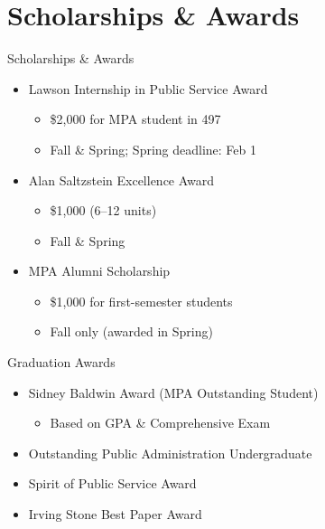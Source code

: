 \documentclass[10pt]{beamer}
\begin{document}
\section{\textcolor{titanorange}{Scholarships \& Awards}}
\begin{frame}{Scholarships \& Awards}
\begin{Large}
\begin{itemize}
  \item Lawson Internship in Public Service Award
    \begin{itemize}
      \item \$2{,}000 for MPA student in 497
      \item Fall \& Spring; Spring deadline: Feb 1
    \end{itemize}
  \item Alan Saltzstein Excellence Award
    \begin{itemize}
      \item \$1{,}000 (6--12 units)
      \item Fall \& Spring
    \end{itemize}
  \item MPA Alumni Scholarship
    \begin{itemize}
      \item \$1{,}000 for first-semester students
      \item Fall only (awarded in Spring)
    \end{itemize}
\end{itemize}
\end{Large}
\end{frame}

\begin{frame}{Graduation Awards}
\begin{Large}
\begin{itemize}
  \item Sidney Baldwin Award (MPA Outstanding Student)
    \begin{itemize}
      \item Based on GPA \& Comprehensive Exam
    \end{itemize}
  \item Outstanding Public Administration Undergraduate
  \item Spirit of Public Service Award
  \item Irving Stone Best Paper Award
\end{itemize}
\end{Large}
\end{frame}
\end{document}
